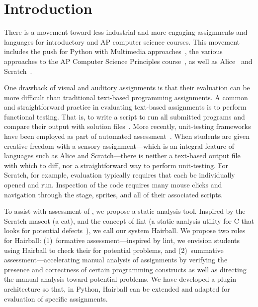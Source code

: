 \section{Introduction}
There is a movement toward less industrial and more engaging assignments and
languages for introductory and AP computer science courses.  This movement
includes the push for Python with Multimedia
approaches~\cite{Adams:2012:SLP:2157136.2157319, Forte:2004:CCC:962752.962945,
  Simon:2010:ERC:1822090.1822151}, the various approaches to the AP Computer
Science Principles course~\cite{Snyder:2012:FFC:2189835.2189852}, as well as
Alice~\cite{Cooper:2003:TOI:611892.611966} and
Scratch~\cite{Maloney:2010:SPL:1868358.1868363}.

One drawback of visual and auditory assignments is that their evaluation can be
more difficult than traditional text-based programming assignments.  A common
and straightforward practice in evaluating text-based assignments is to perform
functional testing. That is, to write a script to run all submitted programs
and compare their output with solution
files~\cite{Jackson:1997:GSP:268084.268210}.  More recently, unit-testing
frameworks have been employed as part of automated
assessment~\cite{Spacco:2006:EMD:1140124.1140131,
  Edwards:2003:RCS:949344.949390}.  When students are given creative freedom
with a sensory assignment---which is an integral feature of languages such as
Alice and Scratch---there is neither a text-based output file with which to
diff, nor a straightforward way to perform unit-testing.  For Scratch, for
example, evaluation typically requires that each \sprogram{} be individually
opened and run.  Inspection of the code requires many mouse clicks and
navigation through the stage, sprites, and all of their associated scripts.

To assist with assessment of , we propose a static analysis tool.
Inspired by the Scratch mascot (a cat), and the concept of lint (a static
analysis utility for C that looks for potential defects~\cite{Johnson78lint}),
we call our system Hairball.  We propose two roles for Hairball: (1)~formative
assessment---inspired by lint, we envision students using Hairball to check
their  for potential problems, and (2)~summative
assessment---accelerating manual analysis of assignments by verifying the
presence and correctness of certain programming constructs as well as directing
the manual analysis toward potential problems.  We have developed a plugin
architecture so that, in Python, Hairball can be extended and adapted for
evaluation of specific assignments.

